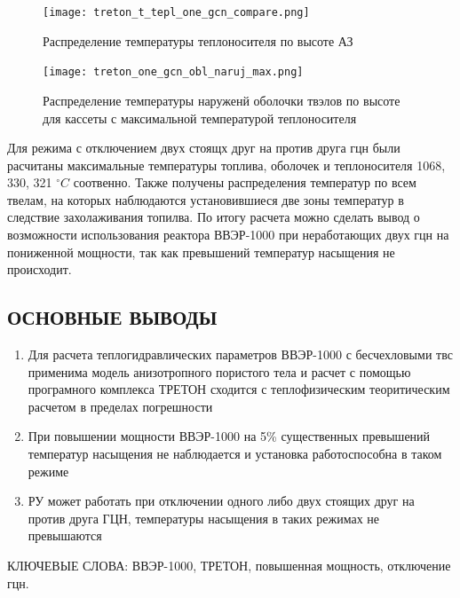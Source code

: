 \begin{figure}[H]
	\begin{center}
		\texttt{[image: treton\_t\_tepl\_one\_gcn\_compare.png]}
		\caption{Распределение температуры теплоносителя по высоте АЗ}
	\end{center}
\end{figure}

\begin{figure}[H]
	\begin{center}
		\texttt{[image: treton\_one\_gcn\_obl\_naruj\_max.png]}
		\caption{Распределение температуры наруженй оболочки твэлов по высоте для кассеты с максимальной температурой теплоносителя}
	\end{center}
\end{figure}

Для режима с отключением двух стоящх друг на против друга гцн были расчитаны максимальные температуры топлива, оболочек и теплоносителя 1068, 330, 321 $^\circ C$ соотвенно. Также получены распределения температур по всем твелам, на которых наблюдаются установившиеся две зоны температур в следствие захолаживания топилва. По итогу расчета можно сделать вывод о возможности использования реактора ВВЭР-1000 при неработающих двух гцн на пониженной мощности, так как превышений температур насыщения не происходит.


\subsection*{ОСНОВНЫЕ ВЫВОДЫ}
\begin{enumerate}
    \item Для расчета теплогидравлических параметров ВВЭР-1000 с бесчехловыми твс применима модель анизотропного пористого тела и расчет с помощью програмного комплекса ТРЕТОН сходится с теплофизическим теоритическим расчетом в пределах погрешности
    \item При повышении мощности ВВЭР-1000 на 5\% существенных превышений температур насыщения не наблюдается и установка работоспособна в таком режиме 
    \item РУ может работать при отключении одного либо двух стоящих друг на против друга ГЦН, температуры насыщения в таких режимах не превышаются
\end{enumerate}



\noindent КЛЮЧЕВЫЕ СЛОВА: ВВЭР-1000, ТРЕТОН, повышенная мощность, отключение гцн.

